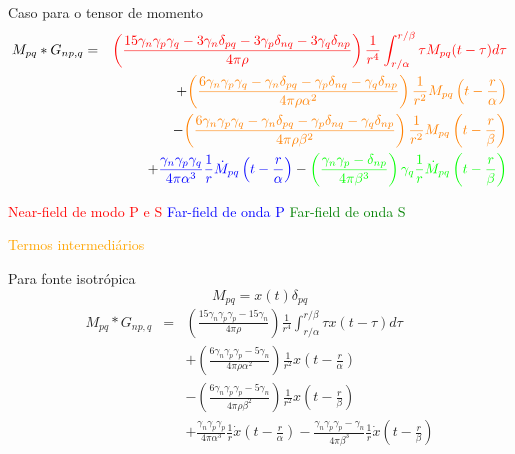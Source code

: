 \documentclass{beamer}
\begin{document}
\begin{frame}{Caso para o tensor de momento}
	\small
	\begin{eqnarray}
	M_{pq} \ast G_{np,q} &=&\textcolor{red}{\left(\frac{15\gamma_n\gamma_p\gamma_q-3\gamma_n\delta_{pq}-3\gamma_p\delta_{nq}-3\gamma_{q}\delta_{np}}{4\pi\rho}\right)\frac{1}{r^4}\int_{r/\alpha}^{r/\beta} \tau M_{pq}(t-\tau) d\tau} \nonumber \\
	&&+ \textcolor{orange}{\left(\frac{6\gamma_n\gamma_p\gamma_q-\gamma_n\delta_{pq}-\gamma_p\delta_{nq}-\gamma_{q}\delta_{np}}{4\pi\rho\alpha^2}\right)\frac{1}{r^2}M_{pq}\left(t-\frac{r}{\alpha}\right)} \nonumber \\
	&&-
	\textcolor{orange}{\left(\frac{6\gamma_n\gamma_p\gamma_q-\gamma_n\delta_{pq}-\gamma_p\delta_{nq}-\gamma_{q}\delta_{np}}{4\pi\rho\beta^2}\right)\frac{1}{r^2}M_{pq}\left(t-\frac{r}{\beta}\right)} \nonumber \\
	&&+\textcolor{blue}{ \frac{\gamma_n \gamma_p \gamma_q}{4\pi\alpha^3}\frac{1}{r}\dot{M}_{pq}\left(t-\frac{r}{\alpha}\right)}- \textcolor{green}{\left(\frac{\gamma_n\gamma_p-\delta_{np}}{4\pi\beta^3}\right)\gamma_{q}\frac{1}{r}\dot{M}_{pq}\left(t-\frac{r}{\beta}\right)} \nonumber
	\end{eqnarray}
	\begin{flushleft}
		\textcolor{red}{Near-field de modo P e S} \hspace{0.5cm}
		\textcolor{blue}{Far-field de onda P}\hspace{0.5cm}
		\textcolor{green}{Far-field de onda S}
	\end{flushleft}
	\begin{center}
		\textcolor{orange}{Termos intermediários}
	\end{center}
\end{frame}

\begin{frame}{Para fonte isotrópica}
	$$M_{pq} = x(t) \delta_{pq} $$
\begin{eqnarray}
M_{pq} \ast G_{np,q} &=&\left(\frac{15\gamma_n\gamma_p\gamma_p-15\gamma_n}{4\pi\rho}\right)\frac{1}{r^4}\int_{r/\alpha}^{r/\beta} \tau x(t-\tau) d\tau \nonumber \\
&&+\left(\frac{6\gamma_n\gamma_p\gamma_p-5\gamma_n}{4\pi\rho\alpha^2}\right)\frac{1}{r^2}x\left(t-\frac{r}{\alpha}\right)  \nonumber \\
&&-\left(\frac{6\gamma_n\gamma_p\gamma_p-5\gamma_n}{4\pi\rho\beta^2}\right)\frac{1}{r^2}x\left(t-\frac{r}{\beta}\right)
 \nonumber \\
&&+\frac{\gamma_n\gamma_p\gamma_p}{4\pi\alpha^3}\frac{1}{r}\dot{x}\left(t-\frac{r}{\alpha}\right)-\frac{\gamma_n\gamma_p\gamma_p-\gamma_n}{4\pi\beta^3}\frac{1}{r}\dot{x}\left(t-\frac{r}{\beta}\right)  \nonumber
\end{eqnarray}
	
\end{frame}
\end{document}
